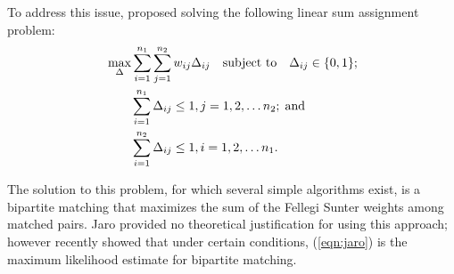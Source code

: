 \documentclass[ba]{imsart}
\begin{document}
To address this issue, \cite{jaro1989} proposed solving the following linear sum assignment problem:
\begin{align}
	\label{eqn:jaro}
	&\max_{\Delta} \sum_{i=1}^{n_1} \sum_{j=1}^{n_2} w_{ij} \Delta_{ij} 
	\quad \text{subject to} \quad \Delta_{ij} \in \{0,1\}; \\
	& \quad \quad \sum_{i=1}^{n_1}  \Delta_{ij}  \leq 1, j=1,2, \ldots n_2; \; \text{and} \notag\\
	& \quad \quad\sum_{i=1}^{n_2}  \Delta_{ij}  \leq 1, i=1,2, \ldots n_1. \notag
\end{align}

The solution to this problem, for which several simple algorithms exist, is a bipartite matching that maximizes the sum of the Fellegi Sunter weights among matched pairs. Jaro provided no theoretical justification for using this approach; however \cite{sadinle_bayesian_2017} recently showed that under certain conditions, (\ref{eqn:jaro}) is the maximum likelihood estimate for bipartite matching. 

%
%
%
\end{document}
